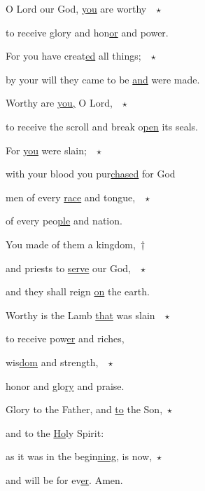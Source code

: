 \noindent O Lord our God, \uline{you} are worthy ~$\star$~\nopagebreak

to receive glory and hon\uline{or} and power.

\noindent For you have creat\uline{ed} all things; ~$\star$~\nopagebreak

by your will they came to be \uline{and} were made.

\noindent Worthy are \uline{you,} O Lord, ~$\star$~\nopagebreak

to receive the scroll and break o\uline{pen} its seals.

\noindent For \uline{you} were slain; ~$\star$~\nopagebreak

with your blood you pur\uline{chased} for God

\noindent men of every \uline{race} and tongue, ~$\star$~\nopagebreak

of every peo\uline{ple} and nation.

\noindent You made of them a kingdom,~†~\nopagebreak

and priests to \uline{serve} our God, ~$\star$~\nopagebreak

and they shall reign \uline{on} the earth.

\noindent Worthy is the Lamb \uline{that} was slain ~$\star$~\nopagebreak

to receive pow\uline{er} and riches,

\noindent wis\uline{dom} and strength, ~$\star$~\nopagebreak

honor and glo\uline{ry} and praise.

\noindent Glory to the Father, and \uline{to} the Son,~$\star$~\nopagebreak

and to the \uline{Ho}ly Spirit:

\noindent as it was in the begin\uline{ning}, is now,~$\star$~\nopagebreak

and will be for ev\uline{er}. Amen.
